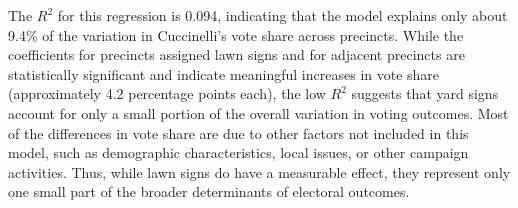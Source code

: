 \documentclass[
]{article}
\begin{document}
The \(R^2\) for this regression is 0.094, indicating that the
model explains only about 9.4\% of the variation in Cuccinelli's vote
share across precincts. While the coefficients for precincts assigned
lawn signs and for adjacent precincts are statistically significant and
indicate meaningful increases in vote share (approximately 4.2
percentage points each), the low \(R^2\) suggests that yard signs
account for only a small portion of the overall variation in voting
outcomes. Most of the differences in vote share are due to other factors
not included in this model, such as demographic characteristics, local
issues, or other campaign activities. Thus, while lawn signs do have a
measurable effect, they represent only one small part of the broader
determinants of electoral outcomes.
\end{document}
